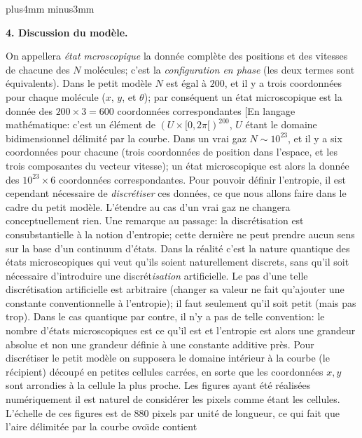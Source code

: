 \vskip4mm plus4mm minus3mm

{ \bf 4. Discussion du mod\`ele.}

\medskip
On appellera {\it \'etat mcroscopique} 
la donn\'ee compl\`ete des positions et des vitesses de chacune des $N$ 
mol\'ecules; c'est la {\it configuration en phase} (les deux termes 
sont \'equivalents).  Dans le petit 
mod\`ele $N$ est \'egal \`a $200$, et il y a trois coordonn\'ees pour 
chaque mol\'ecule ($x$, $y$, et $\theta$); par cons\'equent un \'etat 
microscopique est la donn\'ee des $200 \times 3 = 600$ coordonn\'ees 
correspondantes [En langage math\'ematique: c'est un \'el\'ement
de $(U \times [0, 2\pi [)^{200}$, $U$ \'etant le domaine bidimensionnel 
d\'elimit\'e par la courbe. Dans un vrai gaz $N \sim 10^{23}$,  et il
y a six coordonn\'ees pour chacune (trois coordonn\'ees de position dans 
l'espace, et les trois composantes du vecteur vitesse); un \'etat 
microscopique est alors la donn\'ee des $10^{23} \times 6$ coordonn\'ees 
correspondantes. Pour pouvoir d\'efinir l'entropie, il 
est cependant n\'ecessaire de {\it discr\'etiser} ces donn\'ees, ce 
que nous allons faire dans le cadre du petit mod\`ele. L'\'etendre au 
cas d'un vrai gaz ne changera conceptuellement rien. 
\medskip 
Une remarque au passage:  la discr\'etisation est consubstantielle 
\`a la notion d'entropie; cette derni\`ere ne peut prendre aucun sens 
sur la base d'un continuum d'\'etats.  Dans la r\'ealit\'e c'est 
la nature quantique des \'etats microscopiques 
qui veut qu'ils soient naturellement discrets, sans qu'il soit 
n\'ecessaire d'introduire une discr\'et{\it isation} artificielle. 
Le pas d'une telle discr\'etisation artificielle est arbitraire 
(changer sa valeur ne fait qu'ajouter une constante conventionnelle 
\`a l'entropie); il faut seulement qu'il soit petit (mais pas trop).
Dans le cas quantique par contre, il n'y a pas de
telle convention: le nombre d'\'etats microscopiques est ce 
qu'il est et l'entropie est alors une grandeur absolue et non
une grandeur d\'efinie \`a une constante additive pr\`es.
\medskip 
Pour discr\'etiser le petit mod\`ele on supposera le domaine int\'erieur
\`a la courbe (le r\'ecipient) d\'ecoup\'e en petites cellules carr\'ees,
en sorte que les coordonn\'ees $x,y$ sont arrondies \`a la cellule la 
plus proche. Les figures ayant \'et\'e r\'ealis\'ees num\'eriquement 
il est naturel de consid\'erer les pixels comme \'etant les cellules.
L'\'echelle de ces figures est de $880$ pixels par unit\'e de longueur,
ce qui fait que l'aire d\'elimit\'ee par la courbe ovo{\"\i}de contient

